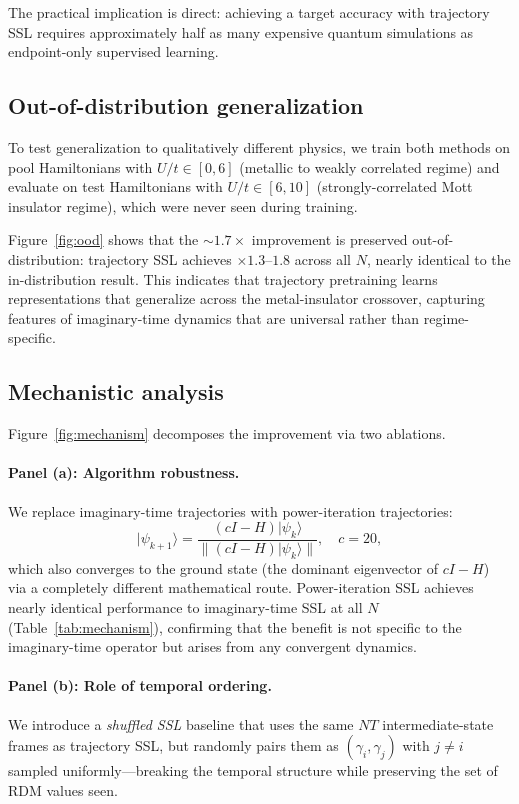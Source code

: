 \documentclass[12pt]{article}
\newcommand{\gam}{\gamma}
\begin{document}
The practical implication is direct: achieving a target accuracy with
trajectory SSL requires approximately half as many expensive quantum simulations
as endpoint-only supervised learning.

\subsection{Out-of-distribution generalization}
\label{sec:ood}

To test generalization to qualitatively different physics, we train both methods
on pool Hamiltonians with $U/t \in [0, 6]$ (metallic to weakly correlated regime)
and evaluate on test Hamiltonians with $U/t \in [6, 10]$ (strongly-correlated
Mott insulator regime), which were never seen during training.

Figure~\ref{fig:ood} shows that the ${\sim}1.7\times$ improvement is preserved
out-of-distribution: trajectory SSL achieves $\times 1.3$--$1.8$ across all $N$,
nearly identical to the in-distribution result.
This indicates that trajectory pretraining learns representations that generalize
across the metal-insulator crossover, capturing features of imaginary-time dynamics
that are universal rather than regime-specific.

\subsection{Mechanistic analysis}
\label{sec:mechanism}

Figure~\ref{fig:mechanism} decomposes the improvement via two ablations.

\paragraph{Panel (a): Algorithm robustness.}
We replace imaginary-time trajectories with power-iteration trajectories:
\begin{equation}
  |\psi_{k+1}\rangle = \frac{(cI - H)|\psi_k\rangle}{\|(cI - H)|\psi_k\rangle\|},
  \quad c = 20,
\end{equation}
which also converges to the ground state (the dominant eigenvector of $cI - H$)
via a completely different mathematical route.
Power-iteration SSL achieves nearly identical performance to imaginary-time SSL
at all $N$ (Table~\ref{tab:mechanism}), confirming that the benefit is not specific
to the imaginary-time operator but arises from any convergent dynamics.

\paragraph{Panel (b): Role of temporal ordering.}
We introduce a \emph{shuffled SSL} baseline that uses the same $NT$ intermediate-state
frames as trajectory SSL, but randomly pairs them as $(\gam_i, \gam_j)$ with
$j \neq i$ sampled uniformly---breaking the temporal structure while preserving
the set of RDM values seen.
\end{document}
